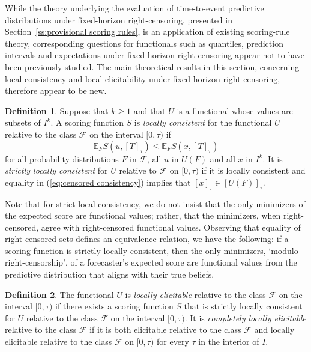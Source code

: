 \documentclass[10pt]{article} %
\theoremstyle{theorem}
\theoremstyle{definition}
\newtheorem{defn}{Definition}
\newcommand{\EEE}{\mathbb{E}}
\begin{document}
While the theory underlying the evaluation of time-to-event predictive distributions under fixed-horizon right-censoring, presented in Section~\ref{ss:provisional scoring rules}, is an application of existing scoring-rule theory, corresponding questions for functionals such as quantiles, prediction intervals and expectations under fixed-horizon right-censoring appear not to have been previously studied. The main theoretical results in this section, concerning local consistency and local elicitability under fixed-horizon right-censoring, therefore appear to be new.

\begin{defn}\label{def:provisionally strictly consistent}
Suppose that $k\geq1$ and that $U$ is a functional whose values are subsets of $I^k$. A scoring function $S$ is \textit{locally consistent} for the functional $U$ relative to the class $\mathcal{F}$ on the interval $[0,\tau)$ if
\begin{equation}\label{eq:censored consistency}
\EEE_F S(u,[T]_\tau) \leq \EEE_F S(x,[T]_\tau)
\end{equation}
for all probability distributions $F$ in $\mathcal{F}$, all $u$ in $U(F)$ and all $x$ in $I^k$. It is \textit{strictly locally consistent} for $U$ relative to $\mathcal{F}$ on $[0,\tau)$ if it is locally consistent and equality in (\ref{eq:censored consistency}) implies that $[x]_\tau\in [U(F)]_\tau$.
\end{defn}

Note that for strict local consistency, we do not insist that the only minimizers of the expected score are functional values; rather, that the minimizers, when right-censored, agree with right-censored functional values. Observing that equality of right-censored sets defines an equivalence relation, we have the following: if a scoring function is strictly locally consistent, then the only minimizers, `modulo right-censorship', of a forecaster's expected score are functional values from the predictive distribution that aligns with their true beliefs.

\begin{defn}\label{def:provisionally elicitable}
The functional $U$ is \textit{locally elicitable} relative to the class $\mathcal{F}$ on the interval $[0,\tau)$ if there exists a scoring function $S$ that is strictly locally consistent for $U$ relative to the class $\mathcal{F}$ on the interval $[0,\tau)$. It is \textit{completely locally elicitable} relative to the class $\mathcal{F}$ if it is both elicitable relative to the class $\mathcal{F}$ and locally elicitable relative to the class $\mathcal{F}$ on $[0,\tau)$ for every $\tau$ in the interior of $I$.
\end{defn}
\end{document}
